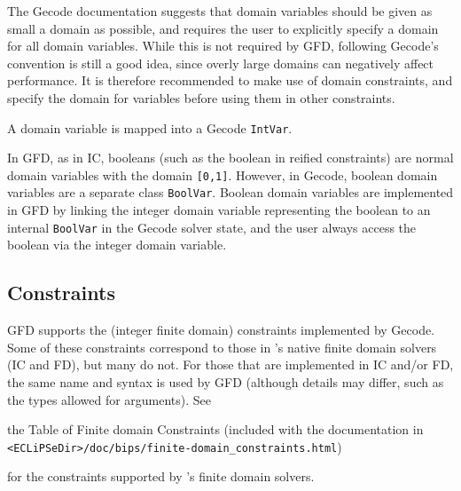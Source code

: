 The Gecode documentation suggests that domain variables should be given as
small a domain as possible, and requires the user to explicitly specify a domain for 
all domain variables. While this is not required by GFD, following Gecode's
convention is still a good idea, since overly large domains can negatively
affect performance.  It is therefore recommended to make use of domain
constraints, and specify the domain for variables before using them in other
constraints.

A domain variable is mapped into a Gecode \verb'IntVar'.

In GFD, as in IC, booleans (such as the boolean in reified constraints) are
normal domain variables with the domain \verb'[0,1]'. However, in Gecode, 
boolean domain variables are a separate class \verb'BoolVar'. Boolean
domain variables are implemented in GFD by linking the integer
domain variable representing the boolean to an internal 
\verb'BoolVar' in the Gecode solver state, and the user always access the 
boolean via the integer domain variable.


\subsection{Constraints}
GFD supports the (integer finite domain) constraints implemented by Gecode.
Some of these constraints correspond to those in \eclipse's native finite 
domain solvers (IC and FD), but many do not. For those that are 
implemented in IC and/or FD, the same name and syntax is used by GFD 
(although details may differ, such as the types allowed for arguments).  
See 
\begin{htmlonly}
\end{htmlonly}
\begin{latexonly}
the Table of Finite domain Constraints (included with the documentation
in \verb|<ECLiPSeDir>/doc/bips/finite-domain_constraints.html|) 
\end{latexonly}
for the constraints supported by \eclipse's finite domain solvers.

